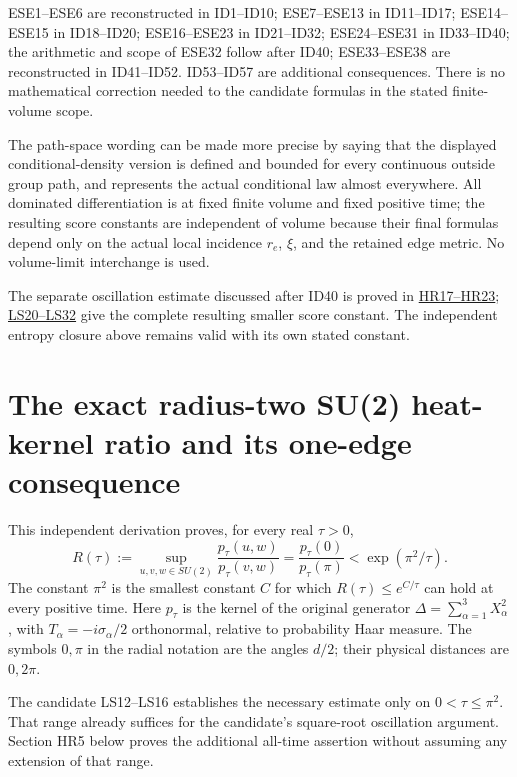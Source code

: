 \documentclass[11pt]{article}
\begin{document}
ESE1–ESE6 are reconstructed in ID1–ID10; ESE7–ESE13 in ID11–ID17; ESE14–ESE15 in ID18–ID20; ESE16–ESE23 in ID21–ID32; ESE24–ESE31 in ID33–ID40; the arithmetic and scope of ESE32 follow after ID40; ESE33–ESE38 are reconstructed in ID41–ID52. ID53–ID57 are additional consequences. There is no mathematical correction needed to the candidate formulas in the stated finite-volume scope.

The path-space wording can be made more precise by saying that the displayed conditional-density version is defined and bounded for every continuous outside group path, and represents the actual conditional law almost everywhere. All dominated differentiation is at fixed finite volume and fixed positive time; the resulting score constants are independent of volume because their final formulas depend only on the actual local incidence \(r_e\), \(\xi\), and the retained edge metric. No volume-limit interchange is used.


The separate oscillation estimate discussed after ID40 is proved in \href{https://github.com/KokunoYumeto/yang-mills-interacting-workbench/blob/main/yang-mills/continuations/20261011-central-signs-shrinking-window/HEAT_RATIO_PROOF.md}{HR17–HR23}; \href{https://github.com/KokunoYumeto/yang-mills-interacting-workbench/blob/main/yang-mills/continuations/20261011-central-signs-shrinking-window/SQUARE_ROOT_LOCAL_SCORE.md}{LS20–LS32} give the complete resulting smaller score constant. The independent entropy closure above remains valid with its own stated constant.
\clearpage
\section*{The exact radius-two SU(2) heat-kernel ratio and its one-edge consequence}

This independent derivation proves, for every real \(\tau>0\),
\[
 R(\tau):=\sup_{u,v,w\in SU(2)}
 \frac{p_\tau(u,w)}{p_\tau(v,w)}
 =\frac{p_\tau(0)}{p_\tau(\pi)}
 <\exp(\pi^2/\tau).                                      \tag{HR1}
\]
The constant \(\pi^2\) is the smallest constant \(C\) for which
\(R(\tau)\le e^{C/\tau}\) can hold at every positive time.
Here \(p_\tau\) is the kernel of the original generator
\(\Delta=\sum_{\alpha=1}^3X_\alpha^2\), with
\(T_\alpha=-i\sigma_\alpha/2\) orthonormal, relative to probability
Haar measure. The symbols \(0,\pi\) in the radial notation are the
angles \(d/2\); their physical distances are \(0,2\pi\).

The candidate LS12–LS16 establishes the necessary estimate only on
\(0<\tau\le\pi^2\). That range already suffices for the candidate's
square-root oscillation argument. Section HR5 below proves the additional
all-time assertion without assuming any extension of that range.
\end{document}
